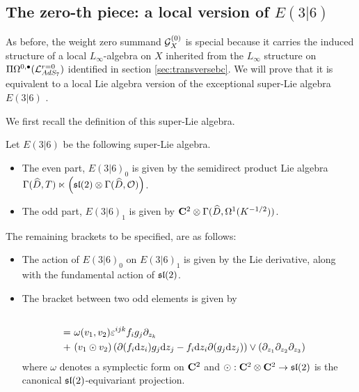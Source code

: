\documentclass[../main.tex]{subfiles}
\begin{document}
\subsection{The zero-th piece: a local version of $E(3|6)$}

As before, the weight zero summand $\mathcal{G}_{X} ^{(0)}$ is special because it carries the induced structure of a local $L_\infty$-algebra on ${X} $ inherited from the $L_\infty$ structure on $\Pi\Omega^{0,\bullet} (\mathcal{L}^{r = 0}_{AdS_7} )$ identified in section \ref{sec:transversebc}. We will prove that it is equivalent to a local Lie algebra version of the exceptional super-Lie algebra $E(3|6)$ \cite{KacBible}.

We first recall the definition of this super-Lie algebra. 

\begin{defn}\label{defn:e(3|6)}
Let $E(3|6)$ be the following super-Lie algebra.
\begin{itemize}
\item The even part, $E(3|6)_0$ is given by the semidirect product Lie algebra $\Gamma(\widehat D, T) \ltimes \left ( \mathfrak{sl}(2) \otimes \Gamma (\widehat D, \mathcal{O}) \right )$. 
\item The odd part, $E(3|6)_1$ is given by $\mathbf{C}^2\otimes \Gamma (\widehat D, \Omega^1(K^{-1/2} ))$. 
\end{itemize}
The remaining brackets to be specified, are as follows:
\begin{itemize}
\item The action of $E(3|6)_0$ on $E(3|6)_1$ is given by the Lie derivative, along with the fundamental action of $\mathfrak{sl}(2)$. 
\item The bracket between two odd elements is given by 
\begin{align*}
[v_1\otimes f_i \d z_i \otimes (\del_{z_1}\del_{z_2}\del_{z_3})^{1/2} &, v_2\otimes g_j \d z_j \otimes (\del_{z_1}\del_{z_2}\del_{z_3})^{1/2} ]  \\ 
 = & \  \omega (v_1, v_2) \eps^{ijk} f_i g_j \del_{z_k}  \\
 + & \  (v_1 \odot v_2) \left ( \del (f_i \d z_i ) g_j \d z_j  - f_i \d z_i \del (g_j \d z_j)  \right )\vee (\del_{z_1}\del_{z_2}\del_{z_3} )
\end{align*}
where $\omega$ denotes a symplectic form on $\mathbf{C}^2$ and $\odot: \mathbf{C}^2\otimes \mathbf{C}^2 \to \mathfrak{sl}(2)$ is the canonical $\mathfrak{sl}(2)$-equivariant projection. 
\end{itemize}
\end{defn}
\end{document}
